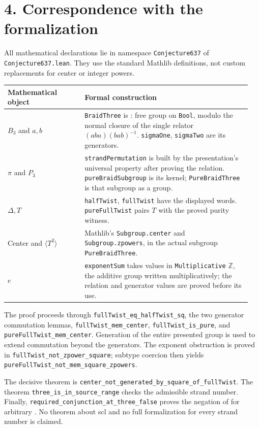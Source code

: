 \documentclass[10pt]{article}
\newcommand{\lean}[1]{\nolinkurl{#1}}
\newcommand{\code}[1]{\texttt{\detokenize{#1}}}
\newcommand{\Z}{\mathbb Z}
\begin{document}
\section*{4. Correspondence with the formalization}
All mathematical declarations lie in namespace \lean{Conjecture637} of
\lean{Conjecture637.lean}. They use the standard Mathlib definitions, not
custom replacements for center or integer powers.

\begin{tabular}{@{}p{0.30\linewidth}p{0.65\linewidth}@{}}
\toprule
Mathematical object & Formal construction \\
\midrule
$B_3$ and $a,b$ & \lean{BraidThree} is \code{PresentedGroup braidRelations}:
free group on \lean{Bool}, modulo the normal closure of the single relator
$(aba)(bab)^{-1}$. \lean{sigmaOne}, \lean{sigmaTwo} are its generators. \\
$\pi$ and $P_3$ & \lean{strandPermutation} is built by the presentation's
universal property after proving the relation. \lean{pureBraidSubgroup} is
its kernel; \lean{PureBraidThree} is that subgroup as a group. \\
$\Delta,T$ & \lean{halfTwist}, \lean{fullTwist} have the displayed words.
\lean{pureFullTwist} pairs $T$ with the proved purity witness. \\
Center and $\langle T^2\rangle$ & Mathlib's \lean{Subgroup.center} and
\lean{Subgroup.zpowers}, in the actual subgroup \lean{PureBraidThree}. \\
$e$ & \lean{exponentSum} takes values in \lean{Multiplicative} $\Z$,
the additive group written multiplicatively; the relation and generator
values are proved before its use. \\
\bottomrule
\end{tabular}

The proof proceeds through \lean{fullTwist_eq_halfTwist_sq}, the two generator
commutation lemmas, \lean{fullTwist_mem_center}, \lean{fullTwist_is_pure},
and \lean{pureFullTwist_mem_center}. Generation of the entire presented group
is used to extend commutation beyond the generators. The exponent obstruction
is proved in \lean{fullTwist_not_zpower_square}; subtype coercion then yields
\lean{pureFullTwist_not_mem_square_zpowers}.

The decisive theorem is
\lean{center_not_generated_by_square_of_fullTwist}.
The theorem \lean{three_is_in_source_range} checks the admissible strand number.
Finally, \lean{required_conjunction_at_three_false} proves the negation of
\code{RequiredConjunctionAtThree Q} for arbitrary \code{Q : Prop}.
No theorem about scl and no full formalization for every strand number is claimed.
\end{document}
